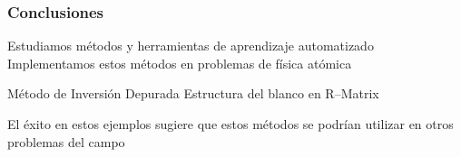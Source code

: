 \documentclass[14pt,compress]{beamer}
\begin{document}
\begin{frame}
\frametitle{Conclusiones}

\begin{itemize}[<+-| alert@+>]
\itemb Estudiamos métodos y herramientas de aprendizaje automatizado
\vspace{0.2cm}
\itemb Implementamos estos métodos en problemas de física atómica
\vspace{0.2cm}
\begin{itemize}
  \itemb Método de Inversión Depurada
\vspace{0.2cm}
  \itemb Estructura del blanco en R--Matrix
\end{itemize}
\itemb El éxito en estos ejemplos sugiere que estos métodos se podrían 
utilizar en otros problemas del campo
\vspace{0.2cm}
\end{itemize}

\end{frame}
\end{document}
